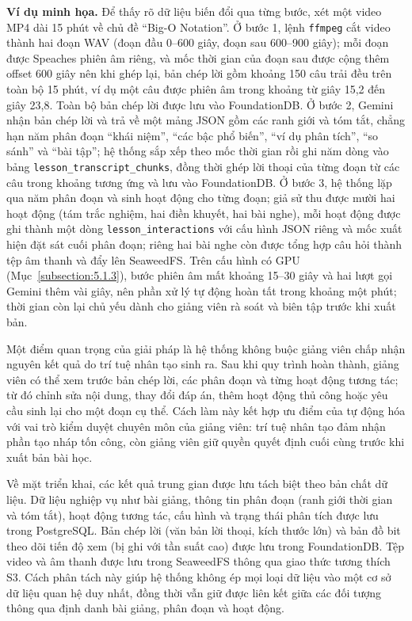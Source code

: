 \documentclass[../DoAn.tex]{subfiles}
\begin{document}
\textbf{Ví dụ minh họa.} Để thấy rõ dữ liệu biến đổi qua từng bước, xét một video MP4 dài 15 phút về chủ đề ``Big-O Notation''. Ở bước 1, lệnh \texttt{ffmpeg} cắt video thành hai đoạn WAV (đoạn đầu 0--600 giây, đoạn sau 600--900 giây); mỗi đoạn được Speaches phiên âm riêng, và mốc thời gian của đoạn sau được cộng thêm offset 600 giây nên khi ghép lại, bản chép lời gồm khoảng 150 câu trải đều trên toàn bộ 15 phút, ví dụ một câu được phiên âm trong khoảng từ giây 15,2 đến giây 23,8. Toàn bộ bản chép lời được lưu vào FoundationDB. Ở bước 2, Gemini nhận bản chép lời và trả về một mảng JSON gồm các ranh giới và tóm tắt, chẳng hạn năm phân đoạn ``khái niệm'', ``các bậc phổ biến'', ``ví dụ phân tích'', ``so sánh'' và ``bài tập''; hệ thống sắp xếp theo mốc thời gian rồi ghi năm dòng vào bảng \texttt{lesson\_transcript\_chunks}, đồng thời ghép lời thoại của từng đoạn từ các câu trong khoảng tương ứng và lưu vào FoundationDB. Ở bước 3, hệ thống lặp qua năm phân đoạn và sinh hoạt động cho từng đoạn; giả sử thu được mười hai hoạt động (tám trắc nghiệm, hai điền khuyết, hai bài nghe), mỗi hoạt động được ghi thành một dòng \texttt{lesson\_interactions} với cấu hình JSON riêng và mốc xuất hiện đặt sát cuối phân đoạn; riêng hai bài nghe còn được tổng hợp câu hỏi thành tệp âm thanh và đẩy lên SeaweedFS. Trên cấu hình có GPU (Mục~\ref{subsection:5.1.3}), bước phiên âm mất khoảng 15--30 giây và hai lượt gọi Gemini thêm vài giây, nên phần xử lý tự động hoàn tất trong khoảng một phút; thời gian còn lại chủ yếu dành cho giảng viên rà soát và biên tập trước khi xuất bản.

Một điểm quan trọng của giải pháp là hệ thống không buộc giảng viên chấp nhận nguyên kết quả do trí tuệ nhân tạo sinh ra. Sau khi quy trình hoàn thành, giảng viên có thể xem trước bản chép lời, các phân đoạn và từng hoạt động tương tác; từ đó chỉnh sửa nội dung, thay đổi đáp án, thêm hoạt động thủ công hoặc yêu cầu sinh lại cho một đoạn cụ thể. Cách làm này kết hợp ưu điểm của tự động hóa với vai trò kiểm duyệt chuyên môn của giảng viên: trí tuệ nhân tạo đảm nhận phần tạo nháp tốn công, còn giảng viên giữ quyền quyết định cuối cùng trước khi xuất bản bài học.

Về mặt triển khai, các kết quả trung gian được lưu tách biệt theo bản chất dữ liệu. Dữ liệu nghiệp vụ như bài giảng, thông tin phân đoạn (ranh giới thời gian và tóm tắt), hoạt động tương tác, cấu hình và trạng thái phân tích được lưu trong PostgreSQL. Bản chép lời (văn bản lời thoại, kích thước lớn) và bản đồ bit theo dõi tiến độ xem (bị ghi với tần suất cao) được lưu trong FoundationDB. Tệp video và âm thanh được lưu trong SeaweedFS thông qua giao thức tương thích S3. Cách phân tách này giúp hệ thống không ép mọi loại dữ liệu vào một cơ sở dữ liệu quan hệ duy nhất, đồng thời vẫn giữ được liên kết giữa các đối tượng thông qua định danh bài giảng, phân đoạn và hoạt động.
\end{document}
